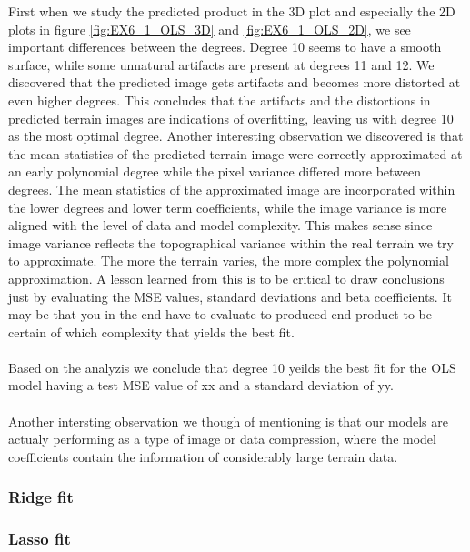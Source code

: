 \documentclass[11pt, a4paper]{article}
\begin{document}
First when we study the predicted product in the 3D plot and especially the 2D plots in figure \ref{fig:EX6_1_OLS_3D} and \ref{fig:EX6_1_OLS_2D}, we see important differences between the degrees. 
Degree 10 seems to have a smooth surface, while some unnatural artifacts are present at degrees 11 and 12. We discovered that the predicted image gets artifacts and becomes more distorted at even higher degrees. 
This concludes that the artifacts and the distortions in predicted terrain images are indications of overfitting, leaving us with degree 10 as the most optimal degree. 
Another interesting observation we discovered is that the mean statistics of the predicted terrain image were correctly approximated at an early polynomial degree while the pixel variance differed more between degrees. 
The mean statistics of the approximated image are incorporated within the lower degrees and lower term coefficients, while the image variance is more aligned with the level of data and model complexity. 
This makes sense since image variance reflects the topographical variance within the real terrain we try to approximate. The more the terrain varies, the more complex the polynomial approximation. 
A lesson learned from this is to be critical to draw conclusions just by evaluating the MSE values, standard deviations and beta coefficients. It may be that you in the end have to 
evaluate to produced end product to be certain of which complexity that yields the best fit. 
\\\\
Based on the analyzis we conclude that degree 10 yeilds the best fit for the OLS model having a test MSE value of xx and a standard deviation of yy.
\\\\
Another intersting observation we though of mentioning is that our models are actualy performing as a type of image or data compression, where the model coefficients contain the information of considerably large terrain data. 

\subsubsection*{Ridge fit}
\subsubsection*{Lasso fit}
\end{document}

